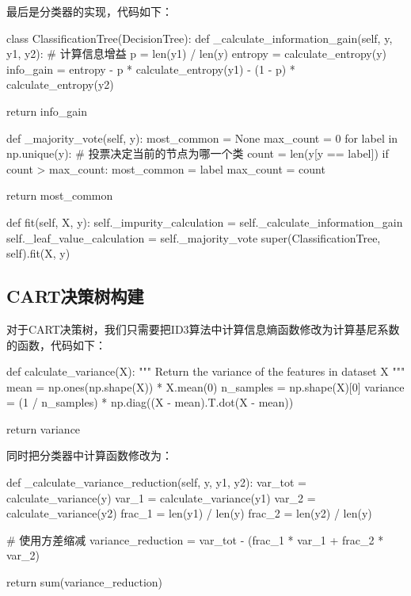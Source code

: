 \documentclass[UTF8,a4paper,10pt]{ctexart}
\begin{document}
最后是分类器的实现，代码如下：

\begin{python}
    class ClassificationTree(DecisionTree):
    def _calculate_information_gain(self, y, y1, y2):
        # 计算信息增益
        p = len(y1) / len(y)
        entropy = calculate_entropy(y)
        info_gain = entropy - p * calculate_entropy(y1) - (1 - p) * calculate_entropy(y2)

        return info_gain

    def _majority_vote(self, y):
        most_common = None
        max_count = 0
        for label in np.unique(y):
            # 投票决定当前的节点为哪一个类
            count = len(y[y == label])
            if count > max_count:
                most_common = label
                max_count = count

        return most_common

    def fit(self, X, y):
        self._impurity_calculation = self._calculate_information_gain
        self._leaf_value_calculation = self._majority_vote
        super(ClassificationTree, self).fit(X, y)

\end{python}

\subsection{CART决策树构建}

对于CART决策树，我们只需要把ID3算法中计算信息熵函数修改为计算基尼系数的函数，代码如下：

\begin{python}
    def calculate_variance(X):
    """ Return the variance of the features in dataset X """
    mean = np.ones(np.shape(X)) * X.mean(0)
    n_samples = np.shape(X)[0]
    variance = (1 / n_samples) * np.diag((X - mean).T.dot(X - mean))

    return variance

\end{python}

同时把分类器中计算函数修改为：

\begin{python}
    def _calculate_variance_reduction(self, y, y1, y2):
    var_tot = calculate_variance(y)
    var_1 = calculate_variance(y1)
    var_2 = calculate_variance(y2)
    frac_1 = len(y1) / len(y)
    frac_2 = len(y2) / len(y)

    # 使用方差缩减
    variance_reduction = var_tot - (frac_1 * var_1 + frac_2 * var_2)

    return sum(variance_reduction)
\end{python}
\end{document}
